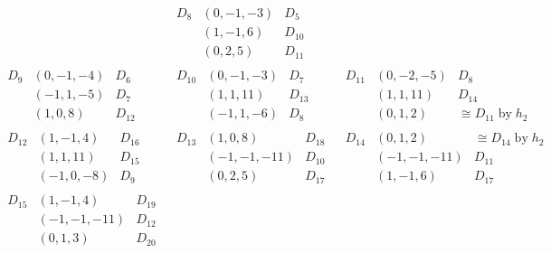 $$\begin{array}{lll}
\begin{array}{lll}
\end{array}
&
\begin{array}{lll}
D_{8} &(0,-1,-3) &\textrm{$D_{5}$}\\ 
   &(1,-1,6) &D_{10}\\ 
   &(0,2,5) &D_{11}
\end{array}
\\ 
\hline
\begin{array}{lll}
D_{9} &(0,-1,-4) &\textrm{$D_{6}$}\\ 
   &(-1,1,-5) &D_{7}\\ 
   &(1,0,8) &D_{12}
\end{array}
&
\begin{array}{lll}
D_{10} &(0,-1,-3) &\textrm{$D_{7}$}\\ 
   &(1,1,11) &D_{13}\\ 
   &(-1,1,-6) &D_{8}
\end{array}
&
\begin{array}{lll}
D_{11} &(0,-2,-5) &\textrm{$D_{8}$}\\ 
   &(1,1,11) &D_{14}\\ 
   &(0,1,2) &\cong D_{11}\;\textrm{by}\; h_{2}
\end{array}
\\ 
\hline
\begin{array}{lll}
D_{12} &(1,-1,4) &D_{16}\\ 
   &(1,1,11) &D_{15}\\ 
   &(-1,0,-8) &\textrm{$D_{9}$}
\end{array}
&
\begin{array}{lll}
D_{13} &(1,0,8) &D_{18}\\ 
   &(-1,-1,-11) &\textrm{$D_{10}$}\\ 
   &(0,2,5) &D_{17}
\end{array}
&
\begin{array}{lll}
D_{14} &(0,1,2) &\cong D_{14}\;\textrm{by}\; h_{2}\\ 
   &(-1,-1,-11) &\textrm{$D_{11}$}\\ 
   &(1,-1,6) &D_{17}
\end{array}
\\ 
\hline
\begin{array}{lll}
D_{15} &(1,-1,4) &D_{19}\\ 
   &(-1,-1,-11) &\textrm{$D_{12}$}\\ 
   &(0,1,3) &D_{20}
\end{array}
&
\begin{array}{lll}

\end{array}
\end{array}$$
